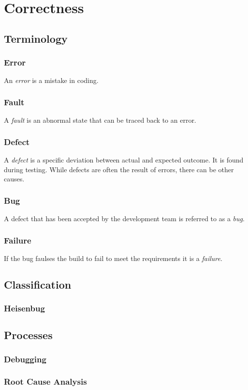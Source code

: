 \section{Correctness}
\label{a:topic/correctness}

\subsection{Terminology}

\subsubsection{Error}

An \textsl{error} is a mistake in coding.

\subsubsection{Fault}

A \textsl{fault} is an abnormal state that can be traced back to an error.

\subsubsection{Defect}

A \textsl{defect} is a specific deviation between actual and expected outcome. It is found during testing. While defects are often the result of errors, there can be other causes.

\subsubsection{Bug}

A defect that has been accepted by the development team is referred to as a \textsl{bug}.

\subsubsection{Failure}

If the bug faulses the build to fail to meet the requirements it is a \textsl{failure}.

\subsection{Classification}

\subsubsection{Heisenbug}

\subsection{Processes}

\subsubsection{Debugging}
\subsubsection{Root Cause Analysis}

